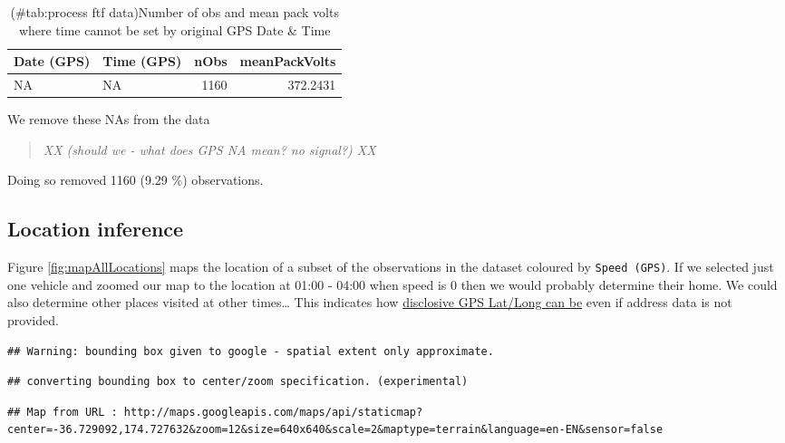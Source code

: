 \documentclass[]{article}
\begin{document}
\begin{table}[t]

\caption{(\#tab:process ftf data)Number of obs and mean pack volts where time cannot be set by original GPS Date & Time}
\centering
\begin{tabular}{l|l|r|r}
\hline
Date (GPS) & Time (GPS) & nObs & meanPackVolts\\
\hline
NA & NA & 1160 & 372.2431\\
\hline
\end{tabular}
\end{table}

We remove these NAs from the data

\begin{quote}
\emph{XX (should we - what does GPS NA mean? no signal?) XX }
\end{quote}

Doing so removed 1160 (9.29 \%) observations.

\subsection{Location inference}\label{location-inference}

Figure \ref{fig:mapAllLocations} maps the location of a subset of the
observations in the dataset coloured by \texttt{Speed\ (GPS)}. If we
selected just one vehicle and zoomed our map to the location at 01:00 -
04:00 when speed is 0 then we would probably determine their home. We
could also determine other places visited at other times\ldots{} This
indicates how
\href{http://toddwschneider.com/posts/analyzing-1-1-billion-nyc-taxi-and-uber-trips-with-a-vengeance/}{disclosive
GPS Lat/Long can be} even if address data is not provided.

\begin{verbatim}
## Warning: bounding box given to google - spatial extent only approximate.
\end{verbatim}

\begin{verbatim}
## converting bounding box to center/zoom specification. (experimental)
\end{verbatim}

\begin{verbatim}
## Map from URL : http://maps.googleapis.com/maps/api/staticmap?center=-36.729092,174.727632&zoom=12&size=640x640&scale=2&maptype=terrain&language=en-EN&sensor=false
\end{verbatim}
\end{document}
